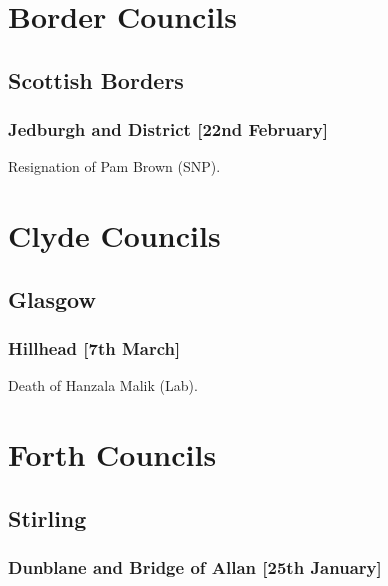 \documentclass[a4paper,openany]{book}
\begin{document}
\begin{resultsiii}
\section{Border Councils}

\subsection*{Scottish Borders}

\subsubsection*{Jedburgh and District \hspace*{\fill}\nolinebreak[1]%
	\enspace\hspace*{\fill}
	[22nd February]}


Resignation of Pam Brown (SNP).

\section{Clyde Councils}

\subsection*{Glasgow}

\subsubsection*{Hillhead \hspace*{\fill}\nolinebreak[1]%
	\enspace\hspace*{\fill}
	[7th March]}


Death of Hanzala Malik (Lab).

\section{Forth Councils}

\subsection*{Stirling}

\subsubsection*{Dunblane and Bridge of Allan \hspace*{\fill}\nolinebreak[1]%
	\enspace\hspace*{\fill}
	[25th January]}


\end{resultsiii}
\end{document}
